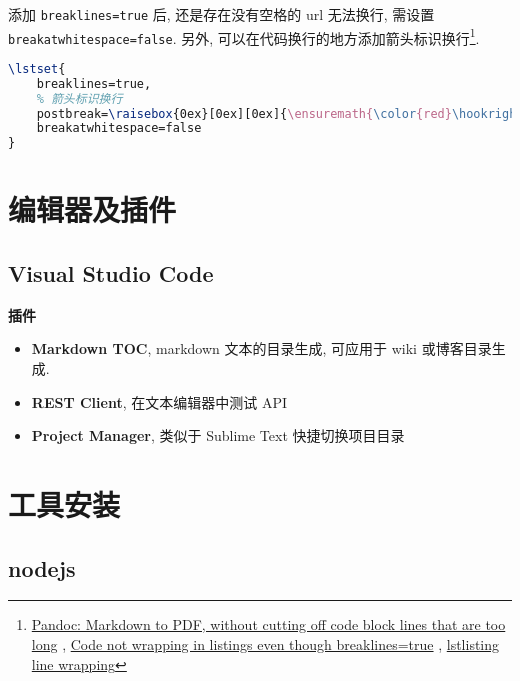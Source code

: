 添加 \lstinline!breaklines=true! 后, 还是存在没有空格的 url 无法换行,
需设置 \lstinline!breakatwhitespace=false!. 另外,
可以在代码换行的地方添加箭头标识换行\footnote{\href{http://tex.stackexchange.com/questions/179926/pandoc-markdown-to-pdf-without-cutting-off-code-block-lines-that-are-too-long}{Pandoc:
  Markdown to PDF, without cutting off code block lines that are too
  long} ,
  \href{http://tex.stackexchange.com/questions/174569/code-not-wrapping-in-listings-even-though-breaklines-true}{Code
  not wrapping in listings even though breaklines=true} ,
  \href{http://tex.stackexchange.com/questions/116534/lstlisting-line-wrapping}{lstlisting
  line wrapping}}.

\begin{lstlisting}[language=TeX]
\lstset{
    breaklines=true,
    % 箭头标识换行
    postbreak=\raisebox{0ex}[0ex][0ex]{\ensuremath{\color{red}\hookrightarrow\space}},
    breakatwhitespace=false
}
\end{lstlisting}

\section{编辑器及插件}\label{ux7f16ux8f91ux5668ux53caux63d2ux4ef6}

\subsection{Visual Studio Code}\label{visual-studio-code}

\textbf{插件}

\begin{itemize}
\tightlist
\item
  \textbf{Markdown TOC}, markdown 文本的目录生成, 可应用于 wiki
  或博客目录生成.
\item
  \textbf{REST Client}, 在文本编辑器中测试 API
\item
  \textbf{Project Manager}, 类似于 Sublime Text 快捷切换项目目录
\end{itemize}

\section{工具安装}\label{ux5de5ux5177ux5b89ux88c5}

\subsection{nodejs}\label{nodejs}

